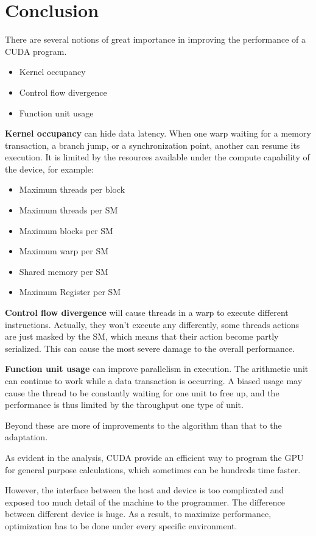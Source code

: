 \documentclass[12pt,a4paper]{article}
\newcommand{\keyword}[1]{{\bfseries \nobreakdash #1}}
\begin{document}
\section{Conclusion}

There are several notions of great importance in improving the performance of a CUDA program. 
\begin{itemize}
  \item Kernel occupancy
  \item Control flow divergence
  \item Function unit usage
\end{itemize}

\keyword{Kernel occupancy} can hide data latency. When one warp waiting for a memory transaction, a branch jump, or a synchronization point, another can resume its execution. It is limited by the resources available under the compute capability of the device, for example:
\begin{itemize}
  \item Maximum threads per block
  \item Maximum threads per SM
  \item Maximum blocks per SM
  \item Maximum warp per SM
  \item Shared memory per SM
  \item Maximum Register per SM
\end{itemize}

\keyword{Control flow divergence} will cause threads in a warp to execute different instructions. Actually, they won't execute any differently, some threads actions are just masked by the SM, which means that their action become partly serialized. This can cause the most severe damage to the overall performance.

\keyword{Function unit usage} can improve parallelism in execution. The arithmetic unit can continue to work while a data transaction is occurring. A biased usage may cause the thread to be constantly waiting for one unit to free up, and the performance is thus limited by the throughput one type of unit.

Beyond these are more of improvements to the algorithm than that to the adaptation.

As evident in the analysis, CUDA provide an efficient way to program the GPU for general purpose calculations, which sometimes can be hundreds time faster.

However, the interface between the host and device is too complicated and exposed too much detail of the machine to the programmer. The difference between different device is huge\cite{CUDAC}. As a result, to maximize performance, optimization has to be done under every specific environment. 
\end{document}
